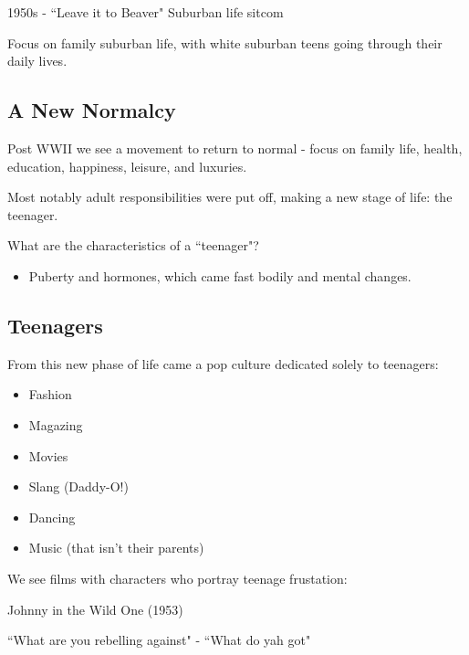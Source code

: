 \documentclass[12pt, a4paper, twoside, openright, titlepage]{book}
\begin{document}
\begin{eg}{}{}
    1950s - ``Leave it to Beaver" Suburban life sitcom
    

    Focus on family suburban life, with white suburban teens going through their daily lives.
\end{eg}

\subsection{A New Normalcy}

Post WWII we see a movement to return to normal - focus on family life, health, education, happiness, leisure, and luxuries.

\begin{note}{}{}
    Most notably adult responsibilities were put off, making a new stage of life: the teenager.
\end{note}

\begin{qst}{}{}
    What are the characteristics of a ``teenager"?
\end{qst}
\begin{itemize}
    \item Puberty and hormones, which came fast bodily and mental changes.
\end{itemize}

\subsection{Teenagers}

From this new phase of life came a pop culture dedicated solely to teenagers:\begin{itemize}
    \item Fashion
    \item Magazing
    \item Movies
    \item Slang (Daddy-O!)
    \item Dancing
    \item Music (that isn't their parents)
\end{itemize}


We see films with characters who portray teenage frustation:

\begin{eg}{}{}
    Johnny in the Wild One (1953)

    ``What are you rebelling against" - ``What do yah got"
\end{eg}
\end{document}
